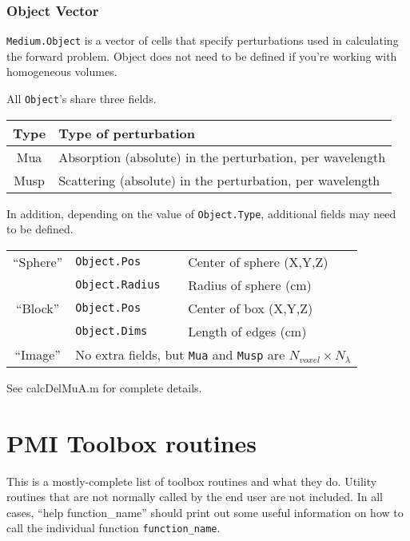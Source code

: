 \documentclass[12pt]{article}
\newcommand{\pmifield}[1]{{\tt #1}}
\newcommand{\pmifile}[1]{{\tt #1}}
\begin{document}
\subsubsection{Object Vector}

\pmifield{Medium.Object} is a vector of cells that specify
perturbations used in calculating the forward problem.  Object does not
need to be defined if you're working with homogeneous volumes.

All \pmifield{Object}'s share three fields.  
\begin{center}
\begin{tabular}{|c|l|}
\hline
Type & Type of perturbation \\
\hline
Mua  & Absorption (absolute) in the perturbation, per wavelength \\
Musp & Scattering (absolute) in the perturbation, per wavelength \\
\hline
\end{tabular}
\end{center}

In addition, depending on the value of
\pmifield{Object.Type}, additional fields may need to be defined.
\begin{center}
\begin{tabular}{|c|l|l|}
\hline
``Sphere'' & \pmifield{Object.Pos}    & Center of sphere (X,Y,Z) \\
           & \pmifield{Object.Radius} & Radius of sphere (cm) \\
\hline
``Block''  & \pmifield{Object.Pos}    & Center of box (X,Y,Z) \\
           & \pmifield{Object.Dims}   & Length of edges (cm) \\
\hline
``Image''  & \multicolumn{2}{l}{No extra fields, but
		\pmifield{Mua} and \pmifield{Musp} are
		 $N_{voxel}\times N_\lambda$} \\
\hline
\end{tabular}
\end{center}
See calcDelMuA.m for complete details.

\section{PMI Toolbox routines}

This is a mostly-complete list of toolbox routines and what they do.
Utility routines that are not normally called by the end user are not
included.  In all cases, ``help function\_name'' should print out some
useful information on how to call the individual function
\pmifile{function\_name}.
\end{document}
